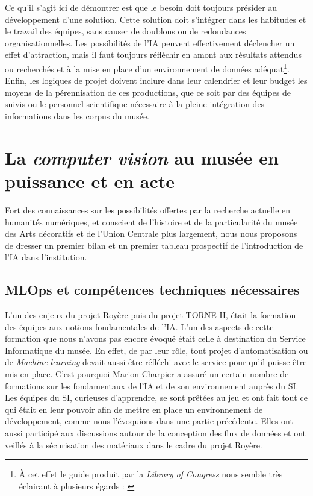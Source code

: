 Ce qu'il s'agit ici de démontrer est que le besoin doit toujours présider au développement d'une solution. Cette solution doit s'intégrer dans les habitudes et le travail des équipes, sans causer de doublons ou de redondances organisationnelles. Les possibilités de l'IA peuvent effectivement déclencher un effet d'attraction, mais il faut toujours réfléchir en amont aux résultats attendus ou recherchés et à la mise en place d'un environnement de données adéquat\footnote{À cet effet le guide produit par la \textit{Library of Congress} nous semble très éclairant à plusieurs égards : \cite{manchester_introducing_2023}}. Enfin, les logiques de projet doivent inclure dans leur calendrier et leur budget les moyens de la pérennisation de ces productions, que ce soit par des équipes de suivis ou le personnel scientifique nécessaire à la pleine intégration des informations dans les corpus du musée.


\chapter{La \textit{computer vision} au musée en puissance et en acte}	

Fort des connaissances sur les possibilités offertes par la recherche actuelle en humanités numériques, et conscient de l'histoire et de la particularité du musée des Arts décoratifs et de l'Union Centrale plus largement, nous nous proposons de dresser un premier bilan et un premier tableau prospectif de l'introduction de l'IA dans l'institution.

\section{MLOps et compétences techniques nécessaires}

L'un des enjeux du projet Royère puis du projet TORNE-H, était la formation des équipes aux notions fondamentales de l'IA. L'un des aspects de cette formation que nous n'avons pas encore évoqué était celle à destination du Service Informatique du musée. En effet, de par leur rôle, tout projet d'automatisation ou de \textit{Machine learning} devait aussi être réfléchi avec le service pour qu'il puisse être mis en place. C’est pourquoi Marion Charpier a assuré un certain nombre de formations sur les fondamentaux de l'IA et de son environnement auprès du SI. Les équipes du SI, curieuses d'apprendre, se sont prêtées au jeu et ont fait tout ce qui était en leur pouvoir afin de mettre en place un environnement de développement, comme nous l'évoquions dans une partie précédente. Elles ont aussi participé aux discussions autour de la conception des flux de données et ont veillés à la sécurisation des matériaux dans le cadre du projet Royère. 

